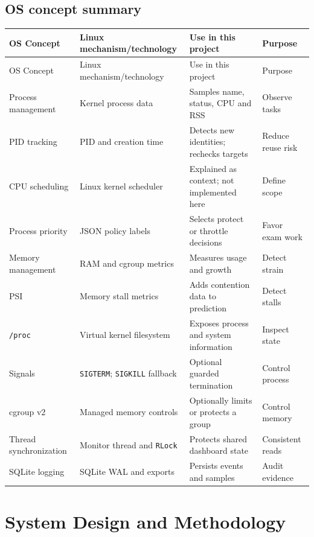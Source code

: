 \documentclass[12pt,a4paper]{article}
\newcommand{\code}[1]{\texttt{#1}}
\begin{document}
\subsection{OS concept summary}
\begingroup
\small
\setlength{\tabcolsep}{3pt}
\begin{longtable}{@{}>{\raggedright\arraybackslash}p{}>{\raggedright\arraybackslash}p{}>{\raggedright\arraybackslash}p{}>{\raggedright\arraybackslash}p{}@{}}
\toprule OS Concept & Linux mechanism/technology & Use in this project & Purpose\\\midrule\endfirsthead
\toprule OS Concept & Linux mechanism/technology & Use in this project & Purpose\\\midrule\endhead
Process management & Kernel process data & Samples name, status, CPU and RSS & Observe tasks\\
PID tracking & PID and creation time & Detects new identities; rechecks targets & Reduce reuse risk\\
CPU scheduling & Linux kernel scheduler & Explained as context; not implemented here & Define scope\\
Process priority & JSON policy labels & Selects protect or throttle decisions & Favor exam work\\
Memory management & RAM and cgroup metrics & Measures usage and growth & Detect strain\\
PSI & Memory stall metrics & Adds contention data to prediction & Detect stalls\\
\code{/proc} & Virtual kernel filesystem & Exposes process and system information & Inspect state\\
Signals & \code{SIGTERM}; \code{SIGKILL} fallback & Optional guarded termination & Control process\\
cgroup v2 & Managed memory controls & Optionally limits or protects a group & Control memory\\
Thread synchronization & Monitor thread and \code{RLock} & Protects shared dashboard state & Consistent reads\\
SQLite logging & SQLite WAL and exports & Persists events and samples & Audit evidence\\
\bottomrule
\end{longtable}
\endgroup

\clearpage
\section{System Design and Methodology}
\end{document}
